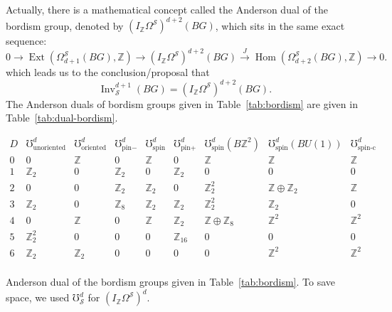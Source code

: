 \documentclass[12pt]{article}
\numberwithin{equation}{section}
\numberwithin{figure}{section}
\theoremstyle{remark}
\renewenvironment{table}[1][]{
  \begin{originaltable}[#1]
    \begin{mdframed}[linecolor=black!0,backgroundcolor=black!1]
}{
    \end{mdframed}
  \end{originaltable}
}
\def\bZ{\mathbb{Z}}
\def\cS{\mathcal{S}}
\def\Hom{\mathop{\mathrm{Hom}}}
\def\Inv{\mathop{\mathrm{Inv}}\nolimits}
\def\Ext{\mathop{\mathrm{Ext}}}
\begin{document}
Actually, there is a mathematical concept called the Anderson dual of the bordism group,
denoted by $(I_\bZ \Omega^\cS)^{d+2}(BG)$, which sits in the same exact sequence: \begin{equation}
0\to \Ext(\Omega^\cS_{d+1}(BG),\bZ) 
\to (I_\bZ \Omega^\cS)^{d+2}(BG) \xrightarrow{J} \Hom(\Omega^\cS_{d+2}(BG),\bZ)\to 0.
\end{equation}
which leads us to the conclusion/proposal that \begin{equation}
\Inv^{d+1}_\cS(BG)  =  (I_\bZ \Omega^\cS)^{d+2}(BG).
\end{equation}
The Anderson duals of bordism groups given in Table~\ref{tab:bordism}
are given in Table~\ref{tab:dual-bordism}.

\begin{table}
\[
\begin{array}{c||cc|ccc|ccccc}
D & \mho_\text{unoriented}^d & \mho_\text{oriented}^d &\mho_\text{pin$-$}^d &
 \mho_\text{spin}^d & \mho_\text{pin$+$}^d 
 &  \mho_\text{spin}^d(B\bZ^2) & \mho_\text{spin}^d(BU(1)) & \mho_\text{spin-c}^d\\
\hline
0 & 0 & \bZ & 0 & \bZ & 0 & \bZ & \bZ & \bZ\\
1 & \bZ_2 & 0 & \bZ_2 & 0 & \bZ_2 & 0 &0& 0 \\
2&  0 & 0 & \bZ_2 & \bZ_2 & 0 & \bZ_2^2& \bZ \oplus \bZ_2 & \bZ \\
3 & \bZ_2 & 0 & \bZ_8 & \bZ_2 & \bZ_2 & \bZ_2^2 & \bZ_2 &0\\
4 & 0 & \bZ & 0 & \bZ & \bZ_2 & \bZ\oplus \bZ_8 &\bZ^2&\bZ^2  \\
5 &  \bZ_2^2 & 0& 0 & 0 & \bZ_{16}& 0 & 0 &0 \\
6 &\bZ_2 & \bZ_2 & 0 & 0 & 0 & 0 &\bZ^2 & \bZ^2\\
\end{array}
\]
\caption{
Anderson dual of the bordism groups given in Table~\ref{tab:bordism}.
To save space, we used $\mho^d_\cS$ for $(I_\bZ \Omega^\cS)^d$.
\label{tab:dual-bordism}}
\end{table}
\end{document}
